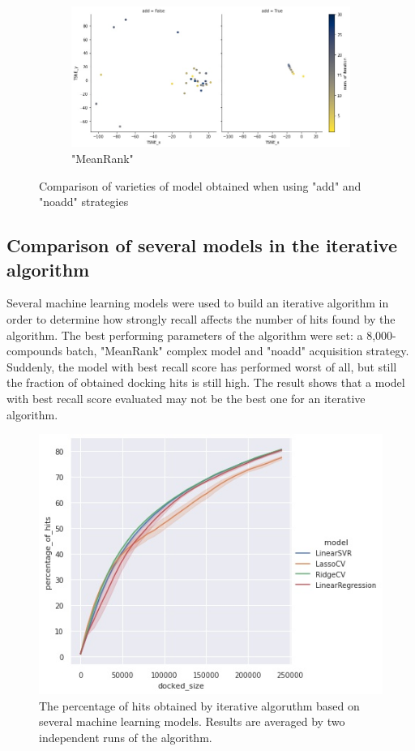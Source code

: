 \begin{figure}
\begin{subfigure}{\textwidth}
\centering
\includegraphics[scale = 0.50]{Images/MRtsne.jpg}
\caption{"MeanRank"}
\end{subfigure}
\caption{Comparison of varieties of model obtained when using "add" and "noadd" strategies}
\label{tsne}
\end{figure}

\subsection{Comparison of several models in the iterative algorithm}

Several machine learning models were used to build an iterative algorithm in order to determine how strongly recall affects the number of hits found by the algorithm. The best performing parameters of the algorithm were set: a 8,000-compounds batch, "MeanRank" complex model and "noadd" acquisition strategy.\\

Suddenly, the model with best recall score has performed worst of all, but still the fraction of obtained docking hits is still high.
The result shows that a model with best recall score evaluated may not be the best one for an iterative algorithm. \\

\begin{figure}[H]
\centering
\includegraphics[width = 0.7\linewidth]{Images/5ztyModelsIterations.jpg}
\caption{The percentage of hits obtained by iterative algoruthm based on several machine learning models. Results are averaged by two independent runs of the algorithm.}
\label{}
\end{figure}


